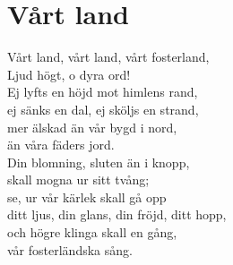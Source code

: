 \section{Vårt land}
Vårt land, vårt land, vårt fosterland,\\
Ljud högt, o dyra ord!\\
Ej lyfts en höjd mot himlens rand,\\
ej sänks en dal, ej sköljs en strand,\\
mer älskad än vår bygd i nord,\\
än våra fäders jord. \\

Din blomning, sluten än i knopp,\\
skall mogna ur sitt tvång;\\
se, ur vår kärlek skall gå opp\\
ditt ljus, din glans, din fröjd, ditt hopp,\\
och högre klinga skall en gång,\\
vår fosterländska sång.\\